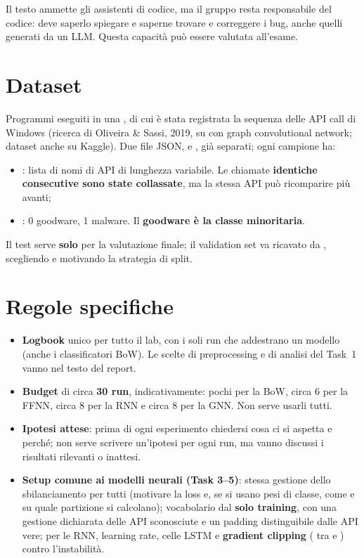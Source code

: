 \begin{nota}[Assistenti AI]
Il testo ammette gli assistenti di codice, ma il gruppo resta responsabile del codice: deve saperlo
spiegare e saperne trovare e correggere i bug, anche quelli generati da un LLM. Questa capacità può
essere valutata all'esame.
\end{nota}

\section{Dataset}
Programmi eseguiti in una , di cui è stata registrata la sequenza delle API call
di Windows (ricerca di Oliveira \& Sassi, 2019, su  con graph
convolutional network; dataset anche su Kaggle). Due file JSON,  e
, già separati; ogni campione ha:
\begin{itemize}
  \item {}: lista di nomi di API di lunghezza variabile. Le chiamate
        \textbf{identiche consecutive sono state collassate}, ma la stessa API può ricomparire più
        avanti;
  \item {}: 0 goodware, 1 malware. Il \textbf{goodware è la classe minoritaria}.
\end{itemize}
Il test serve \textbf{solo} per la valutazione finale; il validation set va ricavato da
, scegliendo e motivando la strategia di split.

\section{Regole specifiche}
\begin{itemize}
  \item \textbf{Logbook} unico per tutto il lab, con i soli run che addestrano un modello (anche i
        classificatori BoW). Le scelte di preprocessing e di analisi del Task~1 vanno nel testo del
        report.
  \item \textbf{Budget} di circa \textbf{30 run}, indicativamente: pochi per la BoW, circa 6 per la
        FFNN, circa 8 per la RNN e circa 8 per la GNN. Non serve usarli tutti.
  \item \textbf{Ipotesi attese}: prima di ogni esperimento chiedersi cosa ci si aspetta e perché;
        non serve scrivere un'ipotesi per ogni run, ma vanno discussi i risultati rilevanti o
        inattesi.
  \item \textbf{Setup comune ai modelli neurali (Task 3--5)}: stessa gestione dello sbilanciamento
        per tutti (motivare la loss e, se si usano pesi di classe, come e su quale partizione si
        calcolano); vocabolario dal \textbf{solo training}, con una gestione dichiarata delle API
        sconosciute e un padding distinguibile dalle API vere; per le RNN, learning rate, celle LSTM
        e \textbf{gradient clipping} ( tra  e
        ) contro l'instabilità.
\end{itemize}


